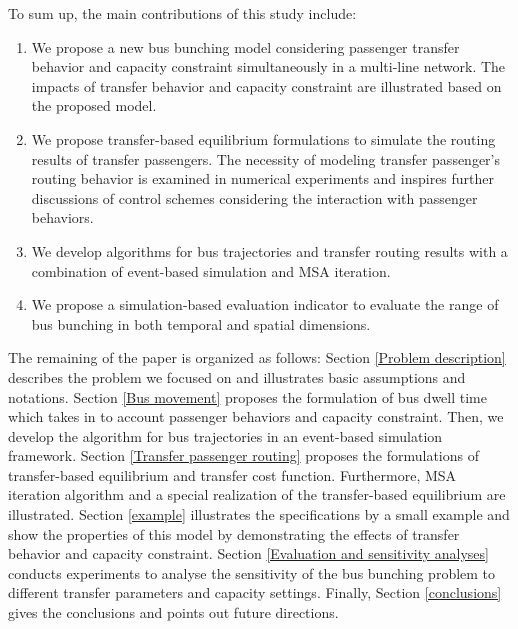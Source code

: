 \documentclass[smallextended]{svjour3}       %
\begin{document}
\begin{Abstract}
To sum up, the main contributions of this study include:
\begin{enumerate}
    \item We propose a new bus bunching model considering passenger transfer behavior and capacity constraint simultaneously in a multi-line network.
    The impacts of transfer behavior and capacity constraint are illustrated based on the proposed model.
    \item We propose transfer-based equilibrium formulations to simulate the routing results of transfer passengers.
    The necessity of modeling transfer passenger's routing behavior is examined in numerical experiments and inspires further discussions of control schemes considering the interaction with passenger behaviors.
    \item We develop algorithms for bus trajectories and transfer routing results with a combination of event-based simulation and MSA iteration. 
    \item We propose a simulation-based evaluation indicator to evaluate the range of bus bunching in both temporal and spatial dimensions.
\end{enumerate}

The remaining of the paper is organized as follows: 
Section \ref{Problem description} describes the problem we focused on and illustrates basic assumptions and notations. 
Section \ref{Bus movement} proposes the formulation of bus dwell time which takes in to account passenger behaviors and capacity constraint.
Then, we develop the algorithm for bus trajectories in an event-based simulation framework. 
Section \ref{Transfer passenger routing} proposes the formulations of transfer-based equilibrium and transfer cost function.
Furthermore, MSA iteration algorithm and a special realization of the transfer-based equilibrium are illustrated.
Section \ref{example} illustrates the specifications by a small example 
and show the properties of this model 
by demonstrating the effects of transfer behavior and capacity constraint.
Section \ref{Evaluation and sensitivity analyses} conducts experiments to analyse the sensitivity of the bus bunching problem 
to different transfer parameters and capacity settings. 
Finally, Section \ref{conclusions} gives the conclusions and points out future directions.



\end{Abstract}
\end{document}
